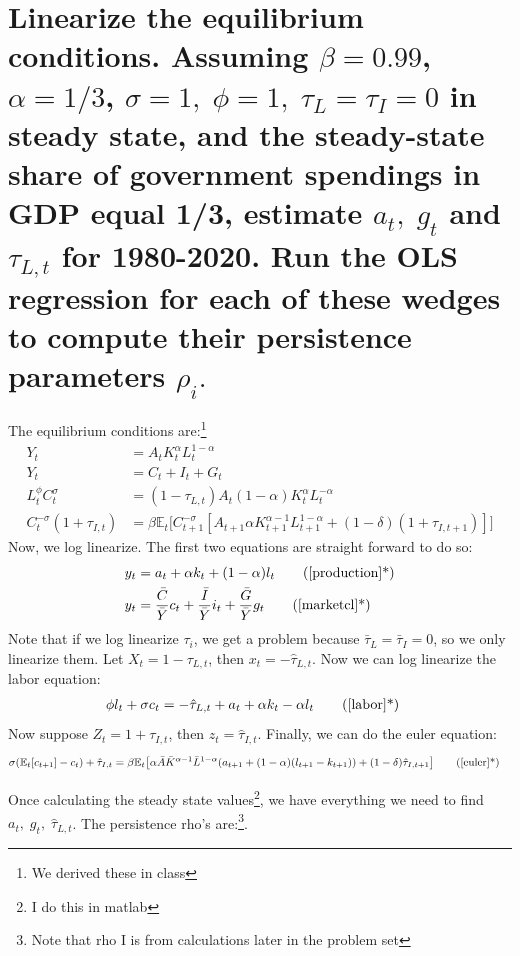 \documentclass[12pt,oneside,reqno]{amsart}
\newcommand{\E}{\mathbb{E}}
\begin{document}
\section{Linearize  the  equilibrium  conditions.   Assuming $\beta=  0.99$, $\alpha=  1/3$, $\sigma=  1,\;\phi=  1,\; \tau_L=\tau_I= 0$ in steady state,  and the steady-state share of government spendings in GDP equal 1/3,  estimate $a_t,\;g_t$ and $\tau_{L,t}$ for 1980-2020.  Run the OLS regression for each of these wedges to compute their persistence parameters $\rho_i.$}
The equilibrium conditions are:\footnote{We derived these in class}
\begin{align}
Y_t & = A_tK_t^\alpha L_t^{1-\alpha} 
\label{production}
\\
Y_t & = C_t+I_t+G_t 
\label{marketcl}
\\
L_t^\phi C_t^\sigma & = (1-\tau_{L,t})A_t(1-\alpha)K_t^\alpha L_t^{-\alpha} 
\label{labor}
\\
C_t^{-\sigma} (1 + \tau_{I,t}) 
& = \beta \E_t \bigg[ C_{t+1}^{-\sigma} [ A_{t+1}\alpha K_{t+1}^{\alpha-1}L_{t+1}^{1-\alpha} +(1-\delta)(1+\tau_{I,t+1})]\bigg]
\label{euler}
\end{align}
Now, we log linearize. The first two equations are straight forward to do so:
\begin{align*}
y_t & = a_t +\alpha k_t + (1-\alpha) l_t 
\tag{\ref{production}*} \label{productionLL} \\
y_t & = \frac{\bar{C}}{\bar{Y}} c_t + \frac{\bar{I}}{\bar{Y}}i_t + \frac{\bar{G}}{\bar{Y}}g_t 
\tag{\ref{marketcl}*} \label{marketLL}
\end{align*}
Note that if we log linearize $\tau_i$, we get a problem because $\bar{\tau}_L=\bar{\tau}_I= 0$, so we only linearize them. Let $X_t = 1-\tau_{L,t}$, then 
$x_t = -\hat{\tau}_{L,t} $. Now we can log linearize the labor equation:
\begin{align*}
\phi l_t +\sigma c_t 
& = -\hat{\tau}_{L,t}  + a_t + \alpha k_t -\alpha l_t
\tag{\ref{labor}*} \label{laborLL}
\end{align*}
Now suppose $Z_t = 1+ \tau_{I,t}$, then $z_t = \hat{\tau}_{I,t}$. Finally, we can do the euler equation: 
\begin{align*}
\sigma(\E_t[c_{t+1}] -c_t) +\hat{\tau}_{I,t} 
& = \beta \E_t \big[ \alpha\bar{A}\bar{K}^{\alpha-1}\bar{L}^{1-\alpha}(a_{t+1}+(1-\alpha)(l_{t+1}-k_{t+1}))+(1-\delta)\hat{\tau}_{I,t+1}
\big]
\tag{\ref{euler}*} \label{eulerLL}
\end{align*}

Once calculating the steady state values\footnote{I do this in matlab}, we have everything we need to find $a_t,\; g_t,\; \hat{\tau}_{L,t}$. The persistence rho's are:\footnote{Note that rho I is from calculations later in the problem set}. 
\end{document}
